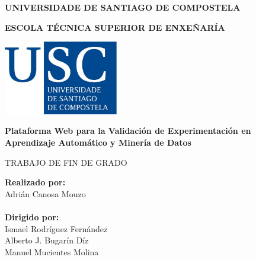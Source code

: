\pagestyle{empty}

\begin{center}
{\bf\large UNIVERSIDADE DE SANTIAGO DE COMPOSTELA}

\vspace{0.5cm}
{\bf\large ESCOLA TÉCNICA SUPERIOR DE ENXEÑARÍA}

\vspace{1.5cm}
\includegraphics[width=5cm]{figuras/logo_usc.jpg}

\vspace{2cm}
{\bf\Large Plataforma Web para la Validación de Experimentación en Aprendizaje Automático y Minería de Datos}

\vspace{1cm}
{\normalsize TRABAJO DE FIN DE GRADO}
\end{center}

\begin{flushright}
\vspace{6cm}
{\bf Realizado por:} \\
Adrián Canosa Mouzo \\
~ \\
{\bf Dirigido por:} \\
Ismael Rodríguez Fernández \\
Alberto J. Bugarín Díz \\
Manuel Mucientes Molina \\
\end{flushright}

